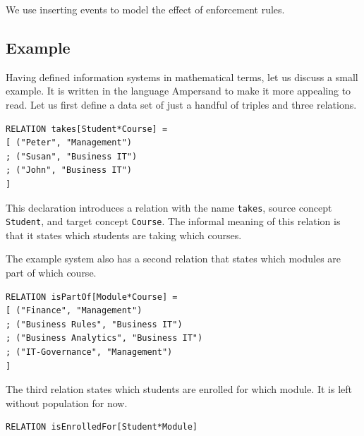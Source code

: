 \documentclass[runningheads]{llncs}
\newcommand{\infsys}{\mathscr{S}}
\begin{document}
   We use inserting events to model the effect of enforcement rules.

\subsection{Example}
\label{sct:Example existing IS}
   Having defined information systems in mathematical terms, let us discuss a small example.
   It is written in the language Ampersand to make it more appealing to read.
   Let us first define a data set of just a handful of triples and three relations.
\begin{verbatim}
RELATION takes[Student*Course] =
[ ("Peter", "Management")
; ("Susan", "Business IT")
; ("John", "Business IT")
]
\end{verbatim}
   This declaration introduces a relation with the name \verb#takes#,
   source concept \verb#Student#, and
   target concept \verb#Course#.
   The informal meaning of this relation is that it states which students are taking which courses.

   The example system also has a second relation that states which modules are part of which course.
\begin{verbatim}
RELATION isPartOf[Module*Course] =
[ ("Finance", "Management")
; ("Business Rules", "Business IT")
; ("Business Analytics", "Business IT")
; ("IT-Governance", "Management")
]
\end{verbatim}
   The third relation states which students are enrolled for which module.
   It is left without population for now.
\begin{verbatim}
RELATION isEnrolledFor[Student*Module]
\end{verbatim}
\end{document}
